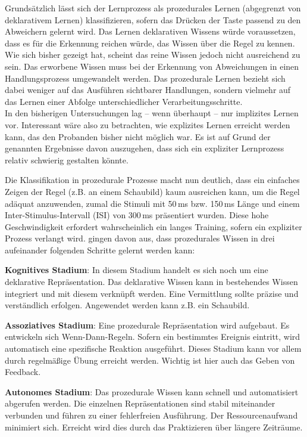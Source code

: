 \documentclass[doc,a4paper,12pt]{apa6}
\begin{document}
Grundsätzlich lässt sich der Lernprozess als prozedurales Lernen (abgegrenzt von deklarativem Lernen) klassifizieren, sofern das Drücken der Taste passend zu den Abweichern gelernt wird. Das Lernen deklarativen Wissens würde voraussetzen, dass es für die Erkennung reichen würde, das Wissen über die Regel zu kennen. Wie sich bisher gezeigt hat, scheint das reine Wissen jedoch nicht ausreichend zu sein. Das erworbene Wissen muss bei der Erkennung von Abweichungen in einen Handlungsprozess umgewandelt werden. Das prozedurale Lernen bezieht sich dabei weniger auf das Ausführen sichtbarer Handlungen, sondern vielmehr auf das Lernen einer Abfolge unterschiedlicher Verarbeitungsschritte.\\
In den bisherigen Untersuchungen lag – wenn überhaupt – nur implizites Lernen vor. Interessant wäre also zu betrachten, wie explizites Lernen erreicht werden kann, das den Probanden bisher nicht möglich war. Es ist auf Grund der genannten Ergebnisse davon auszugehen, dass sich ein expliziter Lernprozess relativ schwierig gestalten könnte.

Die Klassifikation in prozedurale Prozesse macht nun deutlich, dass ein einfaches Zeigen der Regel (z.B. an einem Schaubild) kaum ausreichen kann, um die Regel adäquat anzuwenden, zumal die Stimuli mit 50\,ms bzw. 150\,ms Länge und einem Inter-Stimulus-Intervall (ISI) von 300\,ms präsentiert wurden. Diese hohe Geschwindigkeit erfordert wahrscheinlich ein langes Training, sofern ein expliziter Prozess verlangt wird. \textcite{fitts1967human} gingen davon aus, dass prozedurales Wissen in drei aufeinander folgenden Schritte gelernt werden kann:

\begin{compactenum}
  \item \textbf{Kognitives Stadium}: In diesem Stadium handelt es sich noch um eine deklarative Repräsentation. Das deklarative Wissen kann in bestehendes Wissen integriert und mit diesem verknüpft werden. Eine Vermittlung sollte präzise und verständlich erfolgen. Angewendet werden kann z.B. ein Schaubild.
  \item \textbf{Assoziatives Stadium}: Eine prozedurale Repräsentation wird aufgebaut. Es entwickeln sich Wenn-Dann-Regeln. Sofern ein bestimmtes Ereignis eintritt, wird automatisch eine spezifische Reaktion ausgeführt. Dieses Stadium kann vor allem durch regelmäßige Übung erreicht werden. Wichtig ist hier auch das Geben von Feedback.
  \item \textbf{Autonomes Stadium}: Das prozedurale Wissen kann schnell und automatisiert abgerufen werden. Die einzelnen Repräsentationen sind stabil miteinander verbunden und führen zu einer fehlerfreien Ausführung. Der Ressourcenaufwand minimiert sich. Erreicht wird dies durch das Praktizieren über längere Zeiträume.
\end{compactenum}
\end{document}
